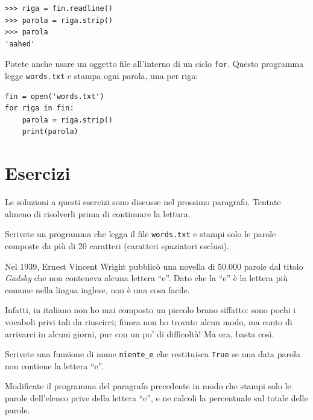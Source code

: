 \documentclass[10pt]{book}
\begin{document}
\begin{verbatim}
>>> riga = fin.readline()
>>> parola = riga.strip()
>>> parola
'aahed'
\end{verbatim}
%
Potete anche usare un oggetto file all'interno di un ciclo {\tt for}.
Questo programma legge {\tt words.txt} e stampa ogni parola, una per riga:

\begin{verbatim}
fin = open('words.txt')
for riga in fin:
    parola = riga.strip()
    print(parola)
\end{verbatim}
%




\section{Esercizi}

Le soluzioni a questi esercizi sono discusse nel prossimo paragrafo. Tentate almeno di risolverli prima di continuare la lettura.

\vspace{0.2in}
\begin{exercise}

Scrivete un programma che legga il file {\tt words.txt} e stampi solo le parole composte da più di 20 caratteri (caratteri spaziatori esclusi).

\end{exercise}

\vspace{0.2in}
\begin{exercise}

Nel 1939, Ernest Vincent Wright pubblicò una novella di 50.000 parole dal titolo
{\em Gadsby} che non conteneva alcuna lettera ``e''.  Dato che la ``e'' è la lettera più comune nella lingua inglese, non è una cosa facile.

Infatti, in italiano non ho mai composto un piccolo brano siffatto: sono pochi i vocaboli privi tali da riuscirci; finora non ho trovato alcun modo, ma conto di arrivarci in alcuni giorni, pur con un po' di difficoltà! Ma ora, basta così.

Scrivete una funzione di nome \verb"niente_e" che restituisca {\tt True} se una data parola non contiene la lettera ``e''.

Modificate il programma del paragrafo precedente in modo che stampi solo le parole dell'elenco prive della lettera ``e'', e ne calcoli la percentuale sul totale delle parole.

\end{exercise}
\end{document}
